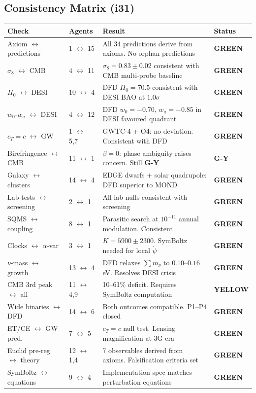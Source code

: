 \documentclass[11pt,a4paper]{article}
\newcommand{\GREEN}{\textcolor{dfdgreen}{\textbf{GREEN}}}
\newcommand{\YELLOW}{\textcolor{dfdyellow}{\textbf{YELLOW}}}
\newcommand{\GY}{\textcolor{dfdgy}{\textbf{G-Y}}}
\begin{document}
\subsection{Consistency Matrix (i31)}

\begin{center}
\begin{longtable}{p{3cm}p{3cm}p{5cm}l}
\toprule
\textbf{Check} & \textbf{Agents} & \textbf{Result} & \textbf{Status} \\
\midrule
\endfirsthead
Axiom $\leftrightarrow$ predictions & 1 $\leftrightarrow$ 15 & All 34 predictions derive from axioms. No orphan predictions & \GREEN \\
$\sigma_8$ $\leftrightarrow$ CMB & 4 $\leftrightarrow$ 11 & $\sigma_8 = 0.83 \pm 0.02$ consistent with CMB multi-probe baseline & \GREEN \\
$H_0$ $\leftrightarrow$ DESI & 10 $\leftrightarrow$ 4 & DFD $H_0 = 70.5$ consistent with DESI BAO at $1.0\sigma$ & \GREEN \\
$w_0$-$w_a$ $\leftrightarrow$ DESI & 4 $\leftrightarrow$ 12 & DFD $w_0 = -0.70$, $w_a = -0.85$ in DESI favoured quadrant & \GREEN \\
$c_T = c$ $\leftrightarrow$ GW & 1 $\leftrightarrow$ 5,7 & GWTC-4 + O4: no deviation. Consistent with DFD & \GREEN \\
Birefringence $\leftrightarrow$ CMB & 11 $\leftrightarrow$ 1 & $\beta = 0$: phase ambiguity raises concern. Still \GY & \GY \\
Galaxy $\leftrightarrow$ clusters & 14 $\leftrightarrow$ 4 & EDGE dwarfs + solar quadrupole: DFD superior to MOND & \GREEN \\
Lab tests $\leftrightarrow$ screening & 2 $\leftrightarrow$ 1 & All lab nulls consistent with screening & \GREEN \\
SQMS $\leftrightarrow$ coupling & 8 $\leftrightarrow$ 1 & Parasitic search at $10^{-11}$ annual modulation. Consistent & \GREEN \\
Clocks $\leftrightarrow$ $\alpha$-var & 3 $\leftrightarrow$ 1 & $K = 5900 \pm 2300$. SymBoltz needed for local $\dot\psi$ & \GREEN \\
$\nu$-mass $\leftrightarrow$ growth & 13 $\leftrightarrow$ 4 & DFD relaxes $\sum m_\nu$ to $0.10$--$0.16$ eV. Resolves DESI crisis & \GREEN \\
CMB 3rd peak $\leftrightarrow$ all & 11 $\leftrightarrow$ 4,9 & 10--61\% deficit. Requires SymBoltz computation & \YELLOW \\
Wide binaries $\leftrightarrow$ DFD & 14 $\leftrightarrow$ 6 & Both outcomes compatible. P1--P4 closed & \GREEN \\
ET/CE $\leftrightarrow$ GW pred. & 7 $\leftrightarrow$ 5 & $c_T = c$ null test. Lensing magnification at 3G era & \GREEN \\
Euclid pre-reg $\leftrightarrow$ theory & 12 $\leftrightarrow$ 1,4 & 7 observables derived from axioms. Falsification criteria set & \GREEN \\
SymBoltz $\leftrightarrow$ equations & 9 $\leftrightarrow$ 4 & Implementation spec matches perturbation equations & \GREEN \\
\bottomrule
\end{longtable}
\end{center}
\end{document}
